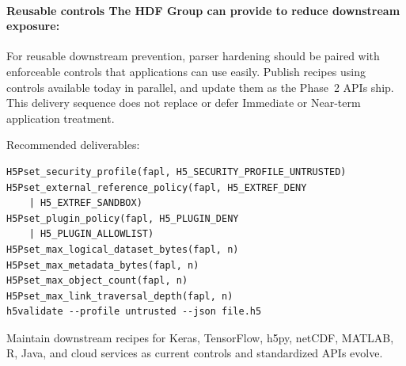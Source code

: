 \documentclass[../main.tex]{subfiles}
\begin{document}
\paragraph{Reusable controls The HDF Group can provide to reduce downstream exposure:}
For reusable downstream prevention, parser hardening should be paired with
enforceable controls that applications can use easily. Publish recipes using
controls available today in parallel, and update them as the Phase~2 APIs ship.
This delivery sequence does not replace or defer Immediate or Near-term
application treatment.

Recommended deliverables:
\begin{verbatim}
H5Pset_security_profile(fapl, H5_SECURITY_PROFILE_UNTRUSTED)
H5Pset_external_reference_policy(fapl, H5_EXTREF_DENY
    | H5_EXTREF_SANDBOX)
H5Pset_plugin_policy(fapl, H5_PLUGIN_DENY
    | H5_PLUGIN_ALLOWLIST)
H5Pset_max_logical_dataset_bytes(fapl, n)
H5Pset_max_metadata_bytes(fapl, n)
H5Pset_max_object_count(fapl, n)
H5Pset_max_link_traversal_depth(fapl, n)
h5validate --profile untrusted --json file.h5
\end{verbatim}

Maintain downstream recipes for Keras, TensorFlow, h5py, netCDF, MATLAB, R,
Java, and cloud services as current controls and standardized APIs evolve.
\fi
\end{document}
